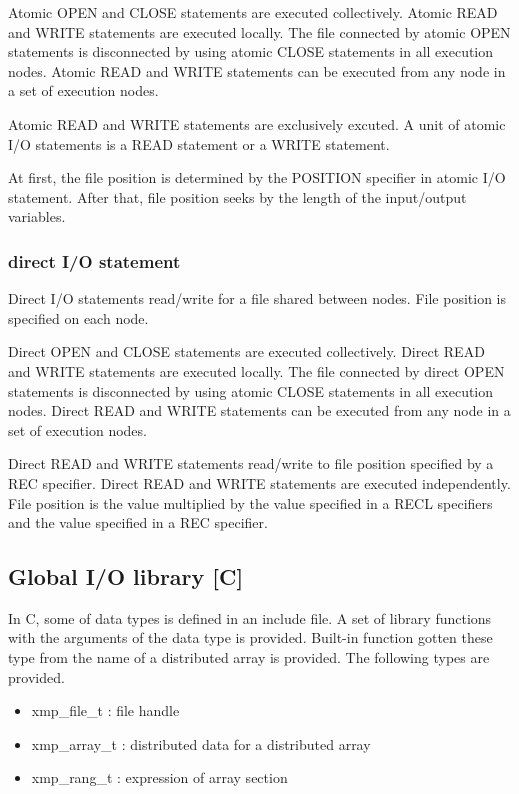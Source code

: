    Atomic OPEN and CLOSE statements are executed collectively. Atomic
   READ and WRITE statements are executed locally.
   The file connected by atomic OPEN statements is disconnected by using
   atomic CLOSE statements in all execution nodes.
   Atomic READ and WRITE statements can be executed from any node in a
   set of execution nodes.

   Atomic READ and WRITE statements are exclusively excuted.
   A unit of atomic I/O statements is a READ statement or a WRITE
   statement.

   At first, the file position is determined by the POSITION specifier in
   atomic I/O statement.
   After that, file position seeks by the length of the input/output
   variables.


   \subsubsection{direct I/O statement}

   Direct I/O statements read/write for a file shared between nodes.
   File position is specified on each node.

   Direct OPEN and CLOSE statements are executed collectively. Direct
   READ and WRITE statements are executed locally.
   The file connected by direct OPEN statements is disconnected by using
   atomic CLOSE statements in all execution nodes.
   Direct READ and WRITE statements can be executed from any node in a
   set of execution nodes.
   
   Direct READ and WRITE statements read/write to file position
   specified by a REC specifier.
   Direct READ and WRITE statements are executed independently.
   File position is the value multiplied by the value specified in a RECL
   specifiers and the value specified in a REC specifier.


   \subsection{Global I/O library [C]}

   In C, some of data types is defined in an include file.
   A set of library functions with the arguments of the data type is
   provided.
   Built-in function gotten these type from the name of a distributed
   array is provided.
   The following types are provided.

   \begin{itemize}
    \item xmp\_file\_t : file handle
    \item xmp\_array\_t : distributed data for a distributed
	  array
    \item xmp\_rang\_t : expression of array section
   \end{itemize}

